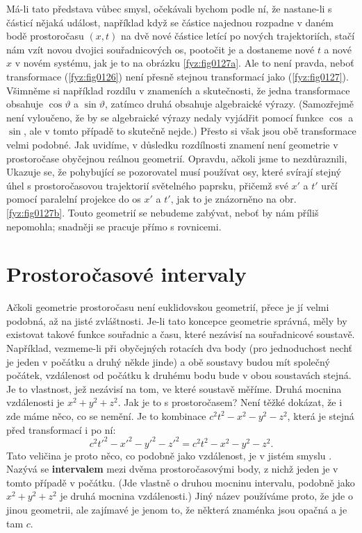     Má-li tato představa vůbec smysl, očekávali bychom podle ní, že nastane-li s částicí nějaká 
    událost, například když se částice najednou rozpadne v daném bodě prostoročasu \((x, t)\) na 
    dvě nové částice letící po nových trajektoriích, stačí nám vzít novou dvojici souřadnicových 
    os, pootočit je a dostaneme nové \(t\) a nové \(x\) v novém systému, jak je to na obrázku 
    \ref{fyz:fig0127a}. Ale to není pravda, neboť transformace (\ref{fyz:fig0126}) není přesně 
    stejnou transformací jako (\ref{fyz:fig0127}). Všimněme si například rozdílu v znameních a 
    skutečnosti, že jedna transformace obsahuje \(\cos\vartheta\) a \(\sin\vartheta\), zatímco 
    druhá obsahuje algebraické výrazy. (Samozřejmě není vyloučeno, že by se algebraické výrazy 
    nedaly vyjádřit pomocí funkce \(\cos\) a \(\sin\), ale v tomto případě to skutečně nejde.) 
    Přesto si však jsou obě transformace velmi podobné. Jak uvidíme, v důsledku rozdílnosti znamení 
    není geometrie v prostoročase obyčejnou reálnou geometrií. Opravdu, ačkoli jsme to 
    nezdůraznili, Ukazuje se, že pohybující se pozorovatel musí používat osy, které svírají stejný 
    úhel s prostoročasovou trajektorií světelného paprsku, přičemž své \(x'\) a \(t'\) určí pomocí 
    paralelní projekce do os \(x'\) a \(t'\), jak to je znázorněno na obr. \ref{fyz:fig0127b}. Touto 
    geometrií se nebudeme zabývat, neboť by nám příliš nepomohla; snadněji se pracuje přímo s 
    rovnicemi.
    
  \section{Prostoročasové intervaly}\label{fyz:IchapXVIIsecII}
    Ačkoli geometrie prostoročasu není euklidovskou geometrií, přece je jí velmi podobná, až na 
    jisté zvláštnosti. Je-li tato koncepce geometrie správná, měly by existovat takové funkce 
    souřadnic a času, které nezávisí na souřadnicové soustavě. Například, vezmeme-li při obyčejných 
    rotacích dva body (pro jednoduchost nechť je jeden v počátku a druhý někde jinde) a obě 
    soustavy budou mít společný počátek, vzdálenost od počátku k druhému bodu bude v obou 
    soustavách stejná. Je to vlastnost, jež nezávisí na tom, ve které soustavě měříme. Druhá 
    mocnina vzdálenosti je \(x^2+y^2+z^2\). Jak je to s prostoročasem? Není těžké dokázat, že i 
    zde máme něco, co se nemění. Je to kombinace \(c^2t^2 - x^2 - y^2 - z^2\), která je stejná před 
    transformací i po ní:
    \begin{equation}\label{fyz:eq222}
      c^2t'^2 - x'^2 - y'^2 - z'^2 = c^2t^2 - x^2 - y^2 - z^2.
    \end{equation}
    Tato veličina je proto něco, co podobně jako vzdálenost, je v jistém smyslu . Nazývá 
    se \textbf{intervalem} mezi dvěma prostoročasovými body, z nichž jeden je v tomto případě v 
    počátku. (Jde vlastně o druhou mocninu intervalu, podobně jako \(x^2 + y^2 + z^2\) je druhá 
    mocnina vzdálenosti.) Jiný název používáme proto, že jde o jinou geometrii, ale zajímavé je 
    jenom to, že některá znaménka jsou opačná a je tam \(c\).
    
